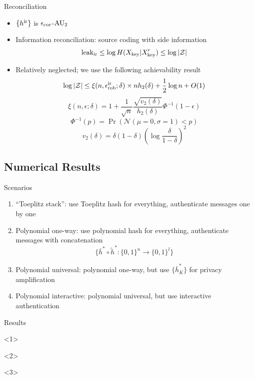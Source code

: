 \documentclass[xcolor=dvipsnames]{beamer}
\newcommand{\?}{\mathrel{?}} %
\newcommand{\abs}[1]{\left\lvert#1\right\rvert} %
\newcommand{\sZ}{\mathcal{Z}}
\newcommand{\ir}{\rm ir}
\newcommand{\leakir}{\mathrm{leak}_{\ir}}
\newcommand{\key}{\rm key}
\newcommand{\rob}{\rm rob}
\newcommand{\cor}{\rm cor}
\begin{document}
\begin{frame}{Reconciliation}
    \begin{itemize}[<+->]
      \item \(\{h^{\ir}\}\) is \(\epsilon_{\cor}\)-\({\rm AU}_2\)
      \item Information reconciliation: source coding with side information
        \[ \leakir \leq \log H(X_{\key}|X'_{\key}) \leq \log \abs{\sZ} \]
      \item Relatively neglected; we use the following achievability result
        \[ \log \abs{\sZ} \leq \xi(n, \epsilon_{\rob}^{\ir}; \delta) \times nh_2(\delta) + \frac{1}{2} \log n + O(1) \]
        \[ \xi(n, \epsilon; \delta) = 1 + \frac{1}{\sqrt{n}} \frac{\sqrt{v_2(\delta)}}{h_2(\delta)} \Phi^{-1}(1 - \epsilon) \]
        \[ \Phi^{-1}(p) = \Pr(\mathcal{N}(\mu=0,\sigma=1) < p) \]
        \[ v_2(\delta) = \delta(1-\delta) {\left( \log \frac{\delta}{1-\delta} \right)}^2 \]
    \end{itemize}
\end{frame}


\subsection{Numerical Results}

\begin{frame}{Scenarios}
  \begin{enumerate}[<+->]
    \item ``Toeplitz stack'': use Toeplitz hash for everything, authenticate messages one by one
    \item Polynomial one-way: use polynomial hash for everything, authenticate messages with concatenation
    \[ \{\bar{h}^* \circ \tilde{h}^* : {\{0,1\}}^{n} \to {\{0,1\}}^{l}\} \]
    \item Polynomial universal: polynomial one-way, but use \(\{\bar{h}^*_K\}\) for privacy amplification
    \item Polynomial interactive: polynomial universal, but use interactive authentication
  \end{enumerate}
\end{frame}

\begin{frame}{Results}
  \begin{onlyenv}<1>
  \end{onlyenv}
  \begin{onlyenv}<2>
  \end{onlyenv}
  \begin{onlyenv}<3>
  \end{onlyenv}
\end{frame}
\end{document}
